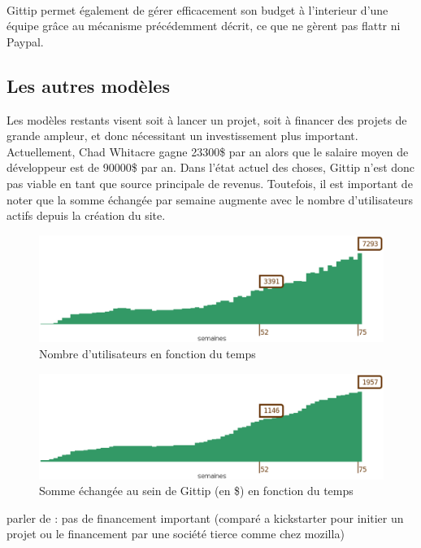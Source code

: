 \paragraph{}
Gittip permet également de gérer efficacement son budget à l'interieur d'une
équipe grâce au mécanisme précédemment décrit, ce que ne gèrent pas flattr ni
Paypal.

\subsection{Les autres modèles}

Les modèles restants visent soit à lancer un projet, soit à financer des projets
de grande ampleur, et donc nécessitant un investissement plus important.
Actuellement, Chad Whitacre gagne 23300\$ par an alors que le salaire moyen de
développeur est de 90000\$ par an. Dans l'état actuel des choses, Gittip n'est
donc pas viable en tant que source principale de revenus. Toutefois, il est
important de noter que la somme échangée par semaine augmente avec le nombre
d'utilisateurs actifs depuis la création du site.

\begin{figure}[h!]
  \caption{Nombre d'utilisateurs en fonction du temps}
  \centering
    \includegraphics[width=16cm]{images/gittip_amount.eps}
\end{figure}
\begin{figure}[h!]
  \caption{Somme échangée au sein de Gittip (en \$) en fonction du temps}
  \centering
    \includegraphics[width=16cm]{images/gittip_user.eps}
\end{figure}

parler de : pas de financement important (comparé a kickstarter pour initier un projet ou
 le financement par une société tierce comme chez mozilla)


